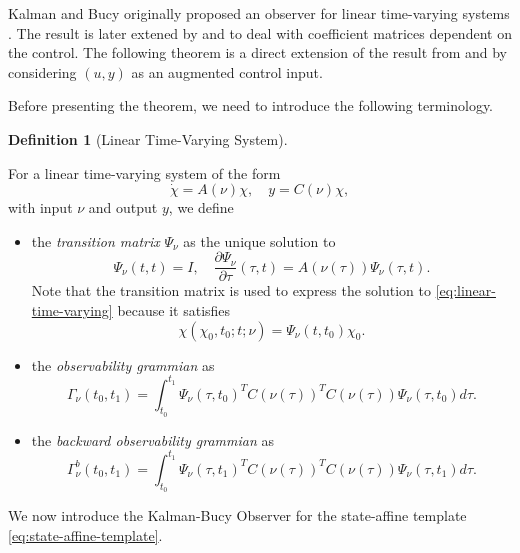\documentclass[
]{book}
\theoremstyle{definition}
\newtheorem{definition}{Definition}[chapter]
\theoremstyle{definition}
\theoremstyle{definition}
\theoremstyle{definition}
\theoremstyle{remark}
\begin{document}
Kalman and Bucy originally proposed an observer for linear time-varying systems \citep{kalman61-new}. The result is later extened by \citep{besanccon96ejc-observer} and \citep{hammouri90cdc-observer} to deal with coefficient matrices dependent on the control. The following theorem is a direct extension of the result from \citep{besanccon96ejc-observer} and \citep{hammouri90cdc-observer} by considering \((u,y)\) as an augmented control input.

Before presenting the theorem, we need to introduce the following terminology.

\begin{definition}[Linear Time-Varying System]
\protect\hypertarget{def:lineartimevarying}{}\label{def:lineartimevarying}

For a linear time-varying system of the form
\begin{equation}
\dot{\chi} = A(\nu) \chi, \quad y = C(\nu) \chi,
\label{eq:linear-time-varying}
\end{equation}
with input \(\nu\) and output \(y\), we define

\begin{itemize}
\item
  the \emph{transition matrix} \(\Psi_\nu\) as the unique solution to
  \[
  \Psi_\nu (t,t) = I, \quad \frac{\partial \Psi_\nu}{\partial \tau}(\tau,t) = A(\nu(\tau)) \Psi_\nu (\tau, t).
  \]
  Note that the transition matrix is used to express the solution to \eqref{eq:linear-time-varying} because it satisfies
  \[
  \chi(\chi_0,t_0;t;\nu) = \Psi_\nu (t,t_0) \chi_0.
  \]
\item
  the \emph{observability grammian} as
  \[
  \Gamma_\nu (t_0,t_1) = \int_{t_0}^{t_1} \Psi_\nu (\tau,t_0)^T C(\nu(\tau))^T C(\nu(\tau)) \Psi_\nu (\tau,t_0) d\tau.
  \]
\item
  the \emph{backward observability grammian} as
  \[
  \Gamma_\nu^b (t_0,t_1) = \int_{t_0}^{t_1} \Psi_\nu (\tau,t_1)^T C(\nu(\tau))^T C(\nu(\tau)) \Psi_\nu (\tau,t_1) d\tau.
  \]
\end{itemize}

\end{definition}

We now introduce the Kalman-Bucy Observer for the state-affine template \eqref{eq:state-affine-template}.
\end{document}
